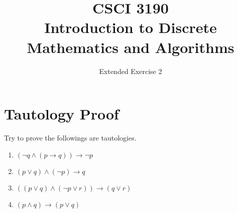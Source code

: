 \documentclass{../../cls/sig-alternate-05-2015}
\begin{document}






%

\title{CSCI 3190 \\ Introduction to Discrete Mathematics and Algorithms}
\subtitle{Extended Exercise 2}

\maketitle
\begin{abstract}

\end{abstract}

\keywords{}

\section{Tautology Proof}
Try to prove the followings are tautologies.
\begin{enumerate}
\item $(\neg q \land (p \rightarrow q)) \rightarrow \neg p$
\item $ (p\lor q) \land (\neg p) \rightarrow q$
\item $ ((p \lor q) \land (\neg p \lor r)) \rightarrow (q \lor r)$
\item $(p \land q) \rightarrow (p \lor q)$
\end{enumerate}
\end{document}
